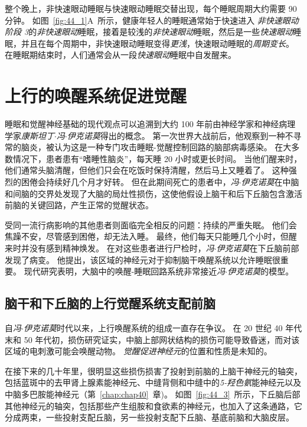 整个晚上，非快速眼动睡眠与快速眼动睡眠交替出现，每个睡眠周期大约需要 90 分钟。
如图~\ref{fig:44_1}A~所示，健康年轻人的睡眠通常始于快速进入 \textit{非快速眼动阶段 3}的\textit{非快速眼动}睡眠，接着是较浅的\textit{非快速眼动}睡眠，然后是一些\textit{快速眼动}睡眠，并且在每个周期中，非快速眼动睡眠变得\textit{更浅}，快速眼动睡眠的\textit{周期变长}。
在睡眠期结束时，人们通常会从一段\textit{快速眼动}睡眠中自发醒来。



\section{上行的唤醒系统促进觉醒}

睡眠和觉醒神经基础的现代观点可以追溯到大约 100 年前由神经学家和神经病理学家\textit{康斯坦丁$\cdot$冯$\cdot$伊克诺莫}得出的概念。
第一次世界大战前后，他观察到一种不寻常的脑炎，被认为这是一种专门攻击睡眠-觉醒控制回路的脑部病毒感染。
在大多数情况下，患者患有“嗜睡性脑炎”，每天睡 20 小时或更长时间。
当他们醒来时，他们通常头脑清醒，但他们只会在吃饭时保持清醒，然后马上又睡着了。
这种强烈的困倦会持续好几个月才好转。
但在此期间死亡的患者中，\textit{冯$\cdot$伊克诺莫}在中脑和间脑的交界处发现了大脑的局灶性损伤，这使他假设上脑干和后下丘脑包含激活前脑的关键回路，产生正常的觉醒状态。


受同一流行病影响的其他患者则面临完全相反的问题：持续的严重失眠。
他们会焦躁不安，尽管感到困倦，却无法入睡。
最终，他们每天只能睡几个小时，但醒来时并没有感到精神焕发。
在对这些患者进行尸检时，\textit{冯$\cdot$伊克诺莫}在下丘脑前部发现了病变。
他提出，该区域的神经元对于抑制脑干唤醒系统以允许睡眠很重要。
现代研究表明，大脑中的唤醒-睡眠回路系统非常接近\textit{冯$\cdot$伊克诺莫}的模型。



\subsection{脑干和下丘脑的上行觉醒系统支配前脑}

自\textit{冯$\cdot$伊克诺莫}时代以来，上行唤醒系统的组成一直存在争议。
在 20 世纪 40 年代末和 50 年代初，损伤研究证实，中脑上部网状结构的损伤可能导致昏迷，而对该区域的电刺激可能会唤醒动物。
\textit{觉醒促进神经元}的位置和性质是未知的。


在接下来的几十年里，很明显这些损伤损害了投射到前脑的上脑干神经元的轴突，包括蓝斑中的去甲肾上腺素能神经元、中缝背侧和中缝中的\textit{5-羟色氨}能神经元以及中脑多巴胺能神经元（第~\ref{chap:chap40}~章)。
如图~\ref{fig:44_3}~所示，下丘脑后部其他神经元的轴突，包括那些产生组胺和食欲素的神经元，也加入了这条通路，它分成两束，一些投射支配丘脑，另一些投射支配下丘脑、基底前脑和大脑皮层。



